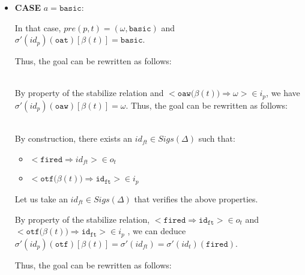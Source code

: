 \documentclass[dvipsnames,12pt]{article}
\begin{document}
\begin{niproof}
\begin{itemize}
\begin{enumerate}
\begin{itemize}
    \item \textbf{CASE} $a=\mathtt{basic}$:

      In that case, $pre(p,t)=(\omega,\mathtt{basic})$ and
      $\sigma'(id_p)(\texttt{oat})[\beta(t)]=\mathtt{basic}$.

      Thus, the goal can be rewritten as follows:

      \\

      By property of the stabilize relation and
      ${<}\mathtt{oaw(}\beta(t)\mathtt{)\Rightarrow{}}\omega{>}\in{}i_p$,
      we have $\sigma'(id_p)(\texttt{oaw})[\beta(t)]=\omega$. Thus,
      the goal can be rewritten as follows:

      \\

      By construction, there exists an $id_{ft}\in{}Sigs(\Delta)$ such
      that:
      \begin{itemize}
      \item ${<}\mathtt{fired\Rightarrow}id_{ft}{>}\in{}o_t$
      \item
        ${<}\mathtt{otf(}\beta(t)\mathtt{)\Rightarrow{}id_{ft}}{>}\in{}i_p$
      \end{itemize}
      
      Let us take an $id_{ft}\in{}Sigs(\Delta)$ that verifies the
      above properties.
      
      By property of the stabilize relation,
      ${<}\mathtt{fired\Rightarrow{}id_{ft}}{>}\in{}o_t$ and
      ${<}\mathtt{otf(}\beta(t)\mathtt{)\Rightarrow{}id_{ft}}{>}\in{}i_p$
      , we can deduce
      $\sigma'(id_p)(\texttt{otf})[\beta(t)]=\sigma'(id_{ft})=\sigma'(id_t)(\texttt{fired})$.

      Thus, the goal can be rewritten as follows:

      \\


\end{itemize}
\end{enumerate}
\end{itemize}
\end{niproof}
\end{document}
